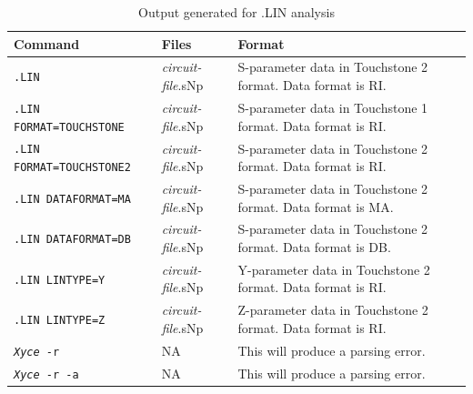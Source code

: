 \begin{table}[htbp]
  \caption{Output generated for .LIN analysis \label{LIN_Output_table}}
  \begin{tabularx}{\linewidth}{|p{2.75in}|Y|Y|}
     \color{white}\textbf{Command} & \color{white}\textbf{Files} & \color{white}\textbf{Format} \\ \hline
\texttt{.LIN} & \emph{circuit-file}.sNp & S-parameter data in Touchstone 2 format. Data format is RI. \\ \hline
\texttt{.LIN FORMAT=TOUCHSTONE} & \emph{circuit-file}.sNp & S-parameter data in Touchstone 1 format. Data format is RI. \\ \hline
\texttt{.LIN FORMAT=TOUCHSTONE2} & \emph{circuit-file}.sNp & S-parameter data in Touchstone 2 format. Data format is RI. \\ \hline
\texttt{.LIN DATAFORMAT=MA} & \emph{circuit-file}.sNp & S-parameter data in Touchstone 2 format. Data format is MA. \\ \hline
\texttt{.LIN DATAFORMAT=DB} & \emph{circuit-file}.sNp & S-parameter data in Touchstone 2 format. Data format is DB. \\ \hline
\texttt{.LIN LINTYPE=Y} & \emph{circuit-file}.sNp & Y-parameter data in Touchstone 2 format. Data format is RI. \\ \hline
\texttt{.LIN LINTYPE=Z} & \emph{circuit-file}.sNp & Z-parameter data in Touchstone 2 format. Data format is RI. \\ \hline

\texttt{\emph{Xyce} -r} & NA & This will produce a parsing error. \\ \hline
\texttt{\emph{Xyce} -r -a} & NA & This will produce a parsing error. \\ \hline

\end{tabularx}
\end{table}


